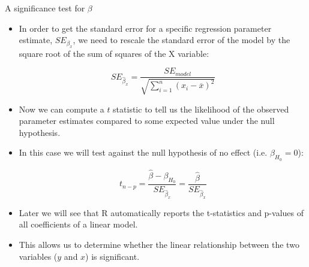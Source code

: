 \documentclass[handout]{beamer}
\begin{document}
\begin{frame}{A significance test for $\beta$}
\scriptsize{
\begin{itemize}

 \item In order to get the standard error for a specific regression parameter estimate, $SE_{\beta_x}$, we need to rescale the standard error of the model by the square root of the sum of squares of the X variable:
 
 \begin{displaymath}
  SE_{\hat{\beta}_x} = \frac{SE_{model}}{\sqrt{\sum_{i=1}^n(x_i-\overline{x})^2}}
   \end{displaymath}


  \item Now we can compute a $t$ statistic to tell us the likelihood of the observed parameter estimates compared to some expected value under the null hypothesis. 
   
 \item In this case we will test against the null hypothesis of no effect (i.e. $\beta_{H_0}=0$):
 
 \begin{displaymath}
  t_{n-p} = \frac{\hat{\beta}-\beta_{H_0}}{ SE_{\hat{\beta}_x}} = \frac{\hat{\beta}}{ SE_{\hat{\beta}_x}}
 \end{displaymath}

 \item Later we will see that R automatically reports the t-statistics and p-values of all coefficients of a linear model.
 
 \item This allows us to determine whether the linear relationship between the two variables ($y$ and $x$) is significant.
 
\end{itemize}


}
 
\end{frame}
\end{document}
